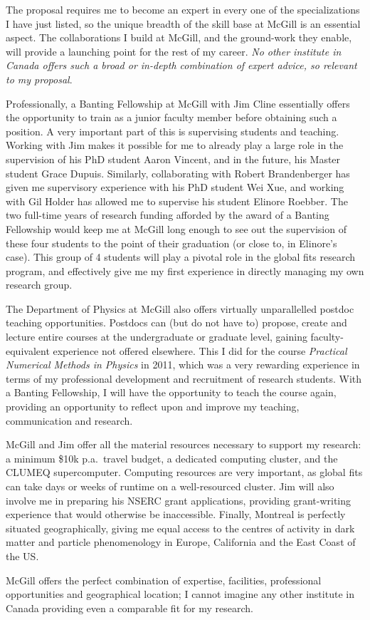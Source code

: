 \documentclass[10pt,oneside,twocolumn,a4paper]{article}
\begin{document}
The proposal requires me to become an expert in every one of the specializations I have just listed, so the unique breadth of the skill base at McGill is an essential aspect.  The collaborations I build at McGill, and the ground-work they enable, will provide a launching point for the rest of my career.  \textit{No other institute in Canada offers such a broad or in-depth combination of expert advice, so relevant to my proposal}.

Professionally, a Banting Fellowship at McGill with Jim Cline essentially offers the opportunity to train as a junior faculty member before obtaining such a position.  A very important part of this is supervising students and teaching.  Working with Jim makes it possible for me to already play a large role in the supervision of his PhD student Aaron Vincent, and in the future, his Master student Grace Dupuis.  Similarly, collaborating with Robert Brandenberger has given me supervisory experience with his PhD student Wei Xue, and working with Gil Holder has allowed me to supervise his student Elinore Roebber.  The two full-time years of research funding afforded by the award of a Banting Fellowship would keep me at McGill long enough to see out the supervision of these four students to the point of their graduation (or close to, in Elinore's case).  This group of 4 students will play a pivotal role in the global fits research program, and effectively give me my first experience in directly managing my own research group.

The Department of Physics at McGill also offers virtually unparallelled postdoc teaching opportunities. Postdocs can (but do not have to) propose, create and lecture entire courses at the undergraduate or graduate level, gaining faculty-equivalent experience not offered elsewhere.  This I did for the course \textit{Practical Numerical Methods in Physics} in 2011, which was a very rewarding experience in terms of my professional development and recruitment of research students.  With a Banting Fellowship, I will have the opportunity to teach the course again, providing an opportunity to reflect upon and improve my teaching, communication and research.

McGill and Jim offer all the material resources necessary to support my research: a minimum \$10k p.a.\ travel budget, a dedicated computing cluster, and the CLUMEQ supercomputer.  Computing resources are very important, as global fits can take days or weeks of runtime on a well-resourced cluster.  Jim will also involve me in preparing his NSERC grant applications, providing grant-writing experience that would otherwise be inaccessible.  Finally, Montreal is perfectly situated geographically, giving me equal access to the centres of activity in dark matter and particle phenomenology in Europe, California and the East Coast of the US.

McGill offers the perfect combination of expertise, facilities, professional opportunities and geographical location; I cannot imagine any other institute in Canada providing even a comparable fit for my research.
\end{document}
